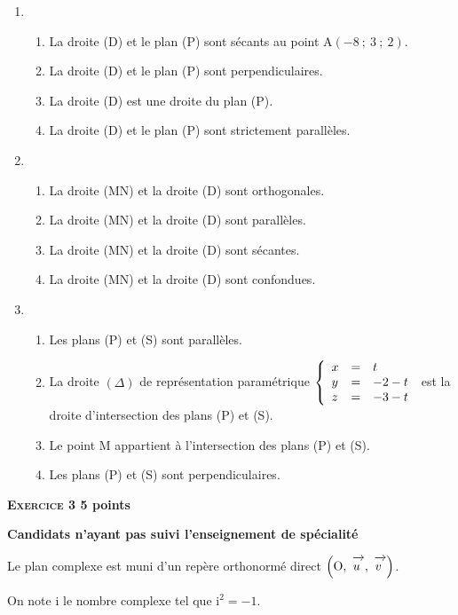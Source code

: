 \documentclass[10pt]{article}
\newcommand{\vect}[1]{\mathchoice%
{\overrightarrow{\displaystyle\mathstrut#1\,\,}}%
{\overrightarrow{\textstyle\mathstrut#1\,\,}}%
{\overrightarrow{\scriptstyle\mathstrut#1\,\,}}%
{\overrightarrow{\scriptscriptstyle\mathstrut#1\,\,}}}
\def\Ouv{$\left(\text{O},~\vect{u},~\vect{v}\right)$}
\begin{document}
\begin{enumerate}
\item 
	\begin{enumerate}
		\item La droite (D) et le plan (P) sont sécants au point A$(- 8~;~3~;~2)$. 
		\item La droite (D) et le plan (P) sont perpendiculaires. 
		\item La droite (D) est une droite du plan (P). 
		\item La droite (D) et le plan (P) sont strictement parallèles.
	\end{enumerate} 
\item 
	\begin{enumerate}
		\item La droite (MN) et la droite (D) sont orthogonales. 
		\item La droite (MN) et la droite (D) sont parallèles. 
		\item La droite (MN) et la droite (D) sont sécantes. 
		\item La droite (MN) et la droite (D) sont confondues.
	\end{enumerate}		 
\item 
	\begin{enumerate}
		\item Les plans (P) et (S) sont parallèles. 
		\item La droite $(\Delta)$ de représentation paramétrique $\left\{\begin{array}{l c l}x&=&t\\y&=&- 2 - t\\z &=& -3-t \end{array}\right.$ est la droite d'intersection des plans  (P) et (S). 
		\item Le point M appartient à l'intersection des plans (P) et (S). 
		\item Les plans (P) et (S) sont perpendiculaires.
	\end{enumerate} 
\end{enumerate}
 
\vspace{0,5cm}

\textbf{\textsc{Exercice 3} \hfill 5 points}
 
\textbf{Candidats n'ayant pas suivi l'enseignement de spécialité}

\medskip
 
Le plan complexe est muni d'un repère orthonormé direct \Ouv.
  
On note i le nombre complexe tel que $\text{i}^2 = - 1$.
 
\end{document}
